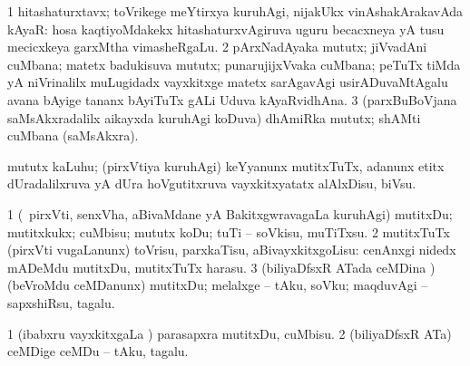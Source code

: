 \noindent
\gl{\pagu}
\bmng
\bnum
\num{1}  hitashaturxtavx; toVrikege meYtirxya kuruhAgi, nijakUkx vinAshakArakavAda kAyaR:  hosa kaqtiyoMdakekx hitashaturxvAgiruva uguru becacxneya yA tusu mecicxkeya garxMtha vimasheRgaLu. 
\num{2}  pArxNadAyaka mututx; jiVvadAni cuMbana; matetx badukisuva mututx; punarujijxVvaka cuMbana; peTuTx tiMda yA niVrinalilx muLugidadx vayxkitxge matetx sarAgavAgi usirADuvaMtAgalu avana bAyige tananx bAyiTuTx gALi Uduva kAyaRvidhAna. 
\num{3}  (parxBuBoVjana saMsAkxradalilx aikayxda kuruhAgi koDuva) dhAmiRka mututx; shAMti cuMbana (saMsAkxra). 
\enum
\emng

\noindent
\hypertarget{kiss(1)nuga}{}\gl{\nuga}
\bmng
{} mututx kaLuhu; (pirxVtiya kuruhAgi) keYyanunx mutitxTuTx, adanunx etitx dUradalilxruva yA dUra hoVgutitxruva vayxkitxyatatx alAlxDisu, biVsu. 
\emng
\eentry

\bentry
{}
\gl{\sakirx}
\bmng
\bnum
\num{1} (\kanmu\ pirxVti, senxVha, aBivaMdane yA BakitxgwravagaLa kuruhAgi) mutitxDu; mutitxkukx; cuMbisu; mututx koDu; tuTi -- soVkisu, muTiTxsu. 
\num{2} mutitxTuTx (pirxVti \mo vugaLanunx) toVrisu, parxkaTisu, aBivayxkitxgoLisu:  cenAnxgi nidedx mADeMdu mutitxDu, mutitxTuTx harasu. 
\num{3} (biliyaDfsxR ATada ceMDina \vi) (beVroMdu ceMDanunx) mutitxDu; melalxge -- tAku, soVku; maqduvAgi -- sapxshiRsu, tagalu. 
\enum
\emng

\noindent
\gl{\akirx}
\bmng
\bnum
\num{1} (ibabxru vayxkitxgaLa \vi) parasapxra mutitxDu, cuMbisu. 
\num{2} (biliyaDfsxR ATa) ceMDige ceMDu -- tAku, tagalu. 
\enum
\emng

